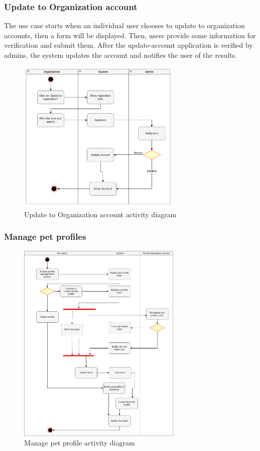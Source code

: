 \subsubsection{Update to Organization account}

The use case starts when an individual user chooses to update to organization accounts, then a form will be displayed. Then, users provide some information for verification and submit them. After the update-account application is verified by admins, the system updates the account and notifies the user of the results.

\begin{figure}[H]
  \centering
  \includegraphics[width=0.7\textwidth]{Figures/update_org.png}
  \caption{Update to Organization account activity diagram}
  \label{fig:update-org}
\end{figure}

\subsubsection{Manage pet profiles}


\begin{figure}[H]
  \centering
  \includegraphics[width=0.7\textwidth]{Figures/manage_pet.png}
  \caption{Manage pet profile activity diagram}
  \label{fig:manage-pet}
\end{figure}

